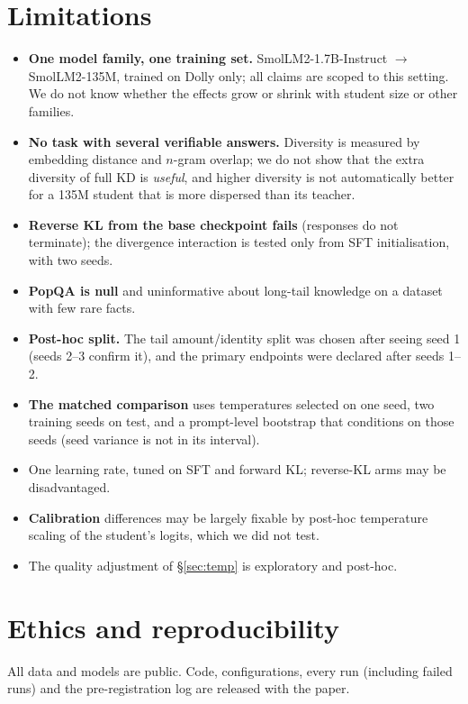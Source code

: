 \documentclass[11pt]{article}
\begin{document}
\section*{Limitations}
\begin{itemize}
\item \textbf{One model family, one training set.} SmolLM2-1.7B-Instruct $\to$ SmolLM2-135M, trained on Dolly only;
  all claims are scoped to this setting. We do not know whether the effects grow or shrink with student size or
  other families.
\item \textbf{No task with several verifiable answers.} Diversity is measured by embedding distance and $n$-gram
  overlap; we do not show that the extra diversity of full KD is \emph{useful}, and higher diversity is not
  automatically better for a 135M student that is more dispersed than its teacher.
\item \textbf{Reverse KL from the base checkpoint fails} (responses do not terminate); the divergence interaction is
  tested only from SFT initialisation, with two seeds.
\item \textbf{PopQA is null} and uninformative about long-tail knowledge on a dataset with few rare facts.
\item \textbf{Post-hoc split.} The tail amount/identity split was chosen after seeing seed 1 (seeds 2--3 confirm
  it), and the primary endpoints were declared after seeds 1--2.
\item \textbf{The matched comparison} uses temperatures selected on one seed, two training seeds on test, and a
  prompt-level bootstrap that conditions on those seeds (seed variance is not in its interval).
\item One learning rate, tuned on SFT and forward KL; reverse-KL arms may be disadvantaged.
\item \textbf{Calibration} differences may be largely fixable by post-hoc temperature scaling of the student's
  logits, which we did not test.
\item The quality adjustment of \S\ref{sec:temp} is exploratory and post-hoc.
\end{itemize}

\section*{Ethics and reproducibility}
All data and models are public. Code, configurations, every run (including failed runs) and the pre-registration
log are released with the paper.
\end{document}
